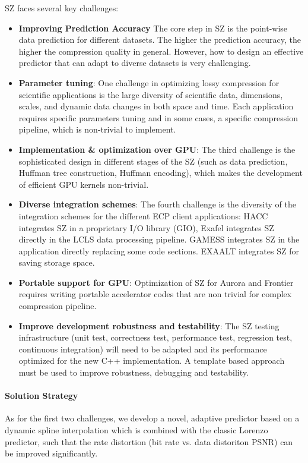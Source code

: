 SZ faces several key challenges:
\begin{itemize}
\item \textbf{Improving Prediction Accuracy} The core step in SZ is the point-wise data prediction for different datasets. The higher the prediction accuracy, the higher the compression quality in general. However, how to design an effective predictor that can adapt to diverse datasets is very challenging.
\item \textbf{Parameter tuning}: One challenge in optimizing lossy compression for scientific applications is the large
diversity of scientific data, dimensions, scales, and dynamic data changes in both space and time. Each application requires specific parameters tuning and in some cases, a specific compression pipeline, which is non-trivial to implement.
\item \textbf{Implementation \& optimization over GPU}: The third challenge is the sophisticated design in different stages of the SZ (such as data prediction, Huffman tree construction, Huffman encoding), which makes the development of efficient GPU kernels non-trivial. 
\item \textbf{Diverse integration schemes}: The fourth challenge is the diversity of the integration schemes for the different ECP client applications: HACC integrates SZ in a proprietary I/O library (GIO), Exafel integrates SZ directly in the LCLS data processing pipeline. GAMESS integrates SZ in the application directly replacing some code sections. EXAALT integrates SZ for saving storage space.
\item \textbf{Portable support for GPU}: Optimization of SZ for Aurora and Frontier requires writing portable accelerator codes that are non trivial for complex compression pipeline. 
\item \textbf{Improve development robustness and testability}: The SZ testing infrastructure (unit test, correctness test, performance test, regression test, continuous integration) will need to be adapted and its performance optimized for the new C++ implementation. A template based approach must be used to improve robustness, debugging and testability.
\end{itemize}

\paragraph{Solution Strategy}

As for the first two challenges, we develop a novel, adaptive predictor based on a dynamic spline interpolation which is combined with the classic Lorenzo predictor, such that the rate distortion (bit rate vs. data distoriton PSNR) can be improved significantly.


